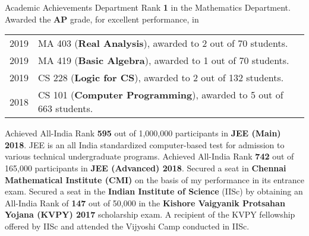 \begin{rubric}{Academic Achievements}
\entry*[2018-]%
	Department Rank \textbf{1} in the Mathematics Department.
\entry* Awarded the \textbf{AP} grade, for excellent performance, in
        
    \begin{tabular}{@{}ll}
       2019 & MA 403 (\textbf{Real Analysis}), awarded to 2 out of 70 students. \\
       2019 & MA 419 (\textbf{Basic Algebra}), awarded to 1 out of 70 students. \\
       2019 & CS 228 (\textbf{Logic for CS}), awarded to 2 out of 132 students. \\
       2018 & CS 101 (\textbf{Computer Programming}), awarded to 5 out of 663 students. \\
    \end{tabular}
    \entry*[2018] Achieved All-India Rank \textbf{595} out of 1,000,000 participants in \textbf{JEE (Main) 2018}. JEE is an all India standardized computer-based test for admission to various technical undergraduate programs.
    \entry*[2018] Achieved All-India Rank \textbf{742} out of 165,000 participants in \textbf{JEE (Advanced) 2018}.
    \entry*[2018] Secured a seat in \textbf{Chennai Mathematical Institute (CMI)} on the basis of my performance in its entrance exam.
    \entry*[2017] Secured a seat in the \textbf{Indian Institute of Science} (IISc) by obtaining an All-India Rank of \textbf{147} out of 50,000 in the \textbf{Kishore Vaigyanik Protsahan Yojana (KVPY) 2017} scholarship exam. 
    \entry*[2018] A recipient of the KVPY fellowship offered by IISc and attended the Vijyoshi Camp conducted in IISc.
\end{rubric}